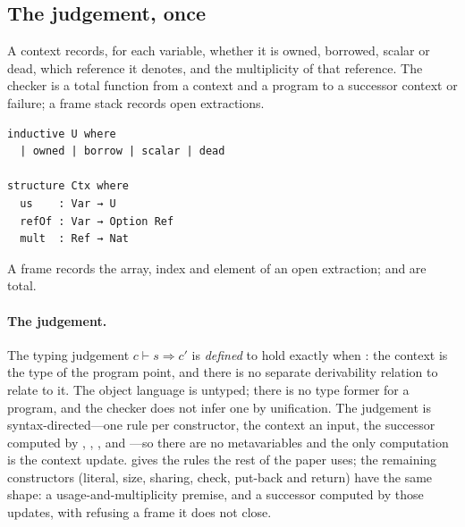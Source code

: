 \documentclass[a4paper,UKenglish,cleveref]{lipics-v2021}
\begin{document}
\subsection{The judgement, once}
A context records, for each variable, whether it is owned, borrowed, scalar or
dead, which reference it denotes, and the multiplicity of that reference. The
checker is a total function from a context and a program to a successor context or
failure; a frame stack records open extractions.
\begin{lstlisting}
inductive U where
  | owned | borrow | scalar | dead

structure Ctx where
  us    : Var → U
  refOf : Var → Option Ref
  mult  : Ref → Nat
\end{lstlisting}
\noindent A frame records the array, index and element of an open extraction;
 and
 are total.

\paragraph*{The judgement.}
The typing judgement $c \vdash s \Rightarrow c'$ is \emph{defined} to hold exactly
when : the context is the type of the program point, and
there is no separate derivability relation to relate to it. The object language is
untyped; there is no type former for a program, and the checker does not infer one
by unification. The judgement is syntax-directed---one rule per constructor, the
context an input, the successor computed by , ,
,  and ---so there are no metavariables and the
only computation is the context update.  gives the rules the rest
of the paper uses; the remaining constructors (literal, size, sharing, check,
put-back and return) have the same shape: a usage-and-multiplicity premise, and a
successor computed by those updates, with  refusing a frame it does not
close.
\end{document}
